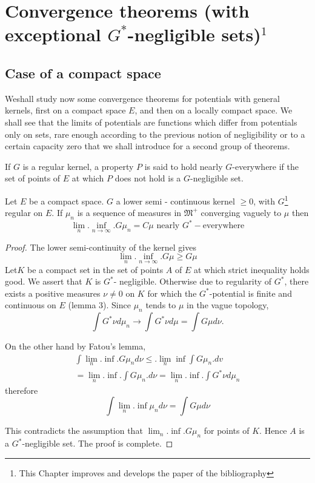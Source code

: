 \chapter{Convergence theorems (with exceptional \texorpdfstring{\boldmath${G^*}$}{G*}-negligible sets)\texorpdfstring{$^1$}{1}}\label{p3:chap3}

\setcounter{section}{6}
\section{Case of a compact space}\label{p3:chap3:sec7}%

We\pageoriginale shall study now some convergence theorems for potentials with
general kernels, first on a compact space $E$, and then on a locally
compact space. We shall see that the limits of potentials are
functions which differ from potentials only on sets, rare enough
according to the previous notion of negligibility or to a certain
capacity zero that we shall introduce for a second group of theorems.  

\begin{defn}\label{p3:chap3:sec7:def}%
  If $G$ is a regular kernel, a property $P$ is said to hold
  nearly $G$-everywhere if the set of points of $E$ at which $P$ does
  not hold is a $G$-negligible set.  
\end{defn}

\begin{thm}\label{p3:chap3:sec7:thm3}
Let $E$ be a compact space. $G$ a lower semi - continuous kernel $\geq
0$, with $G$\footnote{This Chapter improves and develops the paper \cite{6}
  of the bibliography} regular on $E$. If $\mu_n$ is a sequence of
measures in $\mathfrak{M}^+$ converging vaguely to $\mu$ then  
$$
\lim_n.  \inf_{ n \to \infty}. G \mu_n = C \mu \text{ nearly } G^* -
\text{everywhere} 
$$
\end{thm}

\begin{proof} 
  The lower semi-continuity of the kernel gives 
  $$
  \lim_n. \inf_{ n \to \infty}. G \mu \geq G \mu 
  $$
  Let\pageoriginale $K$ be a compact set in the set of points $A$ of $E$ at which
  strict inequality holds good. We assert that $K$ is $G^*$-
  negligible. Otherwise due to regularity of $G^*$, there exists a
  positive measures $\nu \neq 0$ on $K$ for which the $G^*$-potential
  is finite and continuous on $E$ (lemma $3$).  Since $\mu_n$ tends to
  $\mu$ in the vague topology,  
  $$
  \int G^* \nu d \mu_n \to \int G^* \nu d \mu  = \int G \mu d \nu.  
  $$

  On the other hand by Fatou's lemma, 
  \begin{multline*}
  \int \lim_n.  \inf. G \mu_n d \nu \leq. \lim_n \inf \int G \mu_n.  dv\\ 
  =\lim_n. \inf.  \int G \mu_n.  d \nu = \lim  _n. \inf.  \int G^* \nu
  d \mu_n  
  \end{multline*}
  therefore
  $$
  \int \lim_n.  \inf \mu _n d \nu = \int G \mu d \nu 
  $$

  This contradicts the assumption that $\lim _n.  \inf.  G \mu _n$ for
  points of $K$. Hence $A$ is a $G^*$-negligible set. The proof is
  complete.  
\end{proof}

